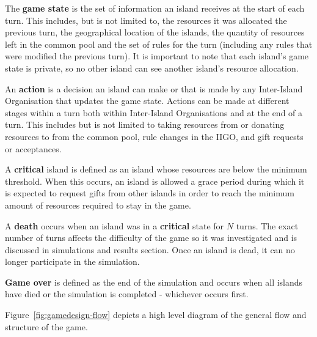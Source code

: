 \begin{definition} \label{def:gamestate}
    The \textbf{game state} is the set of information an island receives at the start of each turn. This includes, but is not limited to, the resources it was allocated the previous turn, the geographical location of the islands, the quantity of resources left in the common pool and the set of rules for the turn (including any rules that were modified the previous turn). It is important to note that each island's game state is private, so no other island can see another island's resource allocation.
\end{definition}

\begin{definition} \label{def:gameaction}
    An \textbf{action} is a decision an island can make or that is made by any Inter-Island Organisation that updates the game state. Actions can be made at different stages within a turn both within Inter-Island Organisations and at the end of a turn. This includes but is not limited to taking resources from or donating resources to from the common pool, rule changes in the IIGO, and gift requests or acceptances. 
\end{definition}

\begin{definition} \label{def:critical}
    A \textbf{critical} island is defined as an island whose resources are below the minimum threshold. When this occurs, an island is allowed a grace period during which it is expected to request gifts from other islands in order to reach the minimum amount of resources required to stay in the game.
\end{definition}

\begin{definition} \label{def:death}
    A \textbf{death} occurs when an island was in a \textbf{critical} state for $N$ turns. The exact number of turns affects the difficulty of the game so it was investigated and is discussed in simulations and results section. Once an island is dead, it can no longer participate in the simulation.
\end{definition}

\begin{definition} \label{def:gameover}
    \textbf{Game over} is defined as the end of the simulation and occurs when all islands have died or the simulation is completed - whichever occurs first.
\end{definition}

Figure~\ref{fig:gamedesign-flow} depicts a high level diagram of the general flow and structure of the game.

